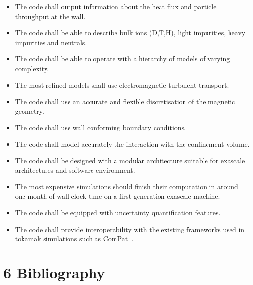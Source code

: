 \documentclass{article}
\begin{document}
\begin{itemize}
\item The code shall output information about the heat flux and particle throughput 
at the wall.

\item The code shall be able to describe bulk ions (D,T,H), light impurities,  heavy 
impurities and neutrals.

\item The code shall be able to operate with a hierarchy of models of varying complexity.

\item The most refined models shall use electromagnetic turbulent transport.

\item The code shall use an accurate and flexible discretisation of the magnetic geometry.

\item The code shall use wall conforming boundary conditions.  

\item The code shall model accurately the interaction with the confinement volume.

\item The code shall be designed with a modular architecture suitable for exascale 
architectures and software environment.

\item The most expensive simulations should finish their computation in around one 
month of wall clock time on a first generation exascale machine.

\item The code shall be equipped with uncertainty quantification features.

\item The code shall provide interoperability with the existing frameworks used in 
tokamak simulations such as ComPat~\cite{ref [23]}.\pagebreak{}
\end{itemize}

\section*{6 {\Large{}{ \textbf{Bibliography}}}}
\end{document}
